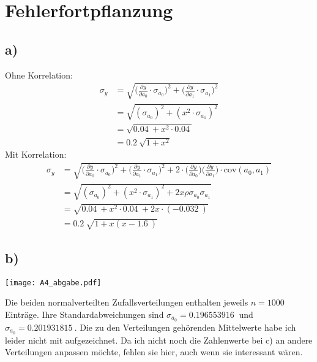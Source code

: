 \newpage\section{Fehlerfortpflanzung}
\subsection{a)}
Ohne Korrelation:
\begin{align}
\sigma_y &= \sqrt{\biggl( \frac{\partial y}{\partial a_0}\cdot \sigma_{a_0}\biggr)^2 
+\biggl( \frac{\partial y}{\partial a_1}\cdot \sigma_{a_1}\biggr)^2}\\
&= \sqrt{( \sigma_{a_0})^2 
+ ( x^2\cdot \sigma_{a_1})^2}\\
&= \sqrt{\SI{0.04}{} + x^2 \cdot \SI{0.04}{}}\\
&= \SI{0.2}{}\sqrt{1+x^2}
\end{align}
Mit Korrelation:
\begin{align}
\sigma_y &= \sqrt{\biggl( \frac{\partial y}{\partial a_0}\cdot \sigma_{a_0}\biggr)^2 
+\biggl( \frac{\partial y}{\partial a_1}\cdot \sigma_{a_1}\biggr)^2
+2\cdot\biggl(\frac{\partial y}{\partial a_0}\biggr)\biggl(\frac{\partial y}{\partial a_1}\biggr)\cdot \text{cov}(a_0,a_1)}\\
&= \sqrt{( \sigma_{a_0})^2 
+ ( x^2\cdot \sigma_{a_1})^2
+ 2x \rho\sigma_{a_0}\sigma_{a_1}}\\
&= \sqrt{\SI{0.04}{} + x^2 \cdot \SI{0.04}{} + 2x\cdot(\SI{-0.032}{})}\\
&= \SI{0.2}{}\sqrt{1+x(x-\SI{1.6}{})}
\end{align}
\subsection{b)}
\begin{center}
\texttt{[image: A4\_abgabe.pdf]}
\end{center}
Die beiden normalverteilten Zufallsverteilungen enthalten jeweils $n=1000$ Einträge. Ihre Standardabweichungen sind $\sigma_{a_0}=\SI{0.196553916}{}$ und $\sigma_{a_0}=\SI{0.201931815}{}$. Die zu den Verteilungen gehörenden Mittelwerte habe ich leider nicht mit aufgezeichnet. Da ich nicht noch die Zahlenwerte bei c) an andere Verteilungen anpassen möchte, fehlen sie hier, auch wenn sie interessant wären.

